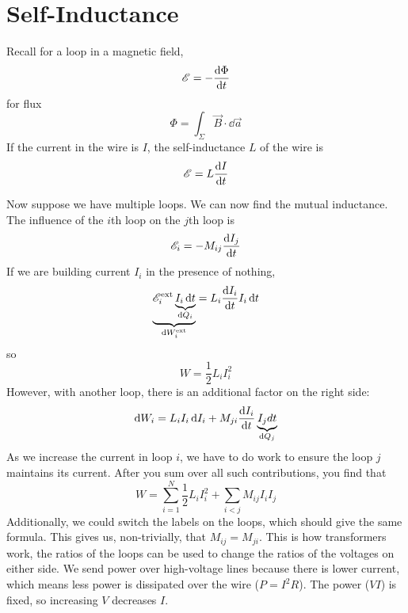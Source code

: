 \documentclass[a4paper,twoside,master.tex]{subfiles}
\begin{document}
\section{Self-Inductance}
\label{sec:self_inductance}

Recall for a loop in a magnetic field,
\begin{equation}
    \mathscr{E} = - \dv{\Phi}{t}
\end{equation}
for flux
\begin{equation}
    \Phi = \int_{\Sigma} \vec{B} \cdot \dd{ \vec{a}}
\end{equation}
If the current in the wire is $ I $, the self-inductance $ L $  of the wire is
\begin{equation}
    \mathscr{E} = L \dv{I}{t}
\end{equation}

Now suppose we have multiple loops. We can now find the mutual inductance. The influence of the $ i $th loop on the $ j $th loop is
\begin{equation}
    \mathscr{E}_i = -M_{ij} \dv{I_j}{t}
\end{equation}
If we are building current $ I_i $ in the presence of nothing,
\begin{equation}
    \underbrace{\mathscr{E}_i^{\text{ext}} \underbrace{I_i \dd{t}}_{\dd{Q_i}}}_{\dd{W_i^{\text{ext}}}}  = L_i \dv{I_i}{t}I_i \dd{t}
\end{equation}
so
\begin{equation}
    W = \frac{1}{2} L_i I_i^2
\end{equation}
However, with another loop, there is an additional factor on the right side:
\begin{equation}
    \dd{W_i} = L_i I_i \dd{I_i} + M_{ji} \dv{I_i}{t}\underbrace{I_j dt}_{\dd{Q_j}}
\end{equation}
As we increase the current in loop $ i $, we have to do work to ensure the loop $ j $ maintains its current. After you sum over all such contributions, you find that
\begin{equation}
    W = \sum_{i=1}^{N} \frac{1}{2} L_i I_i^2 + \sum_{i<j} M_{ij} I_i I_j
\end{equation}
Additionally, we could switch the labels on the loops, which should give the same formula. This gives us, non-trivially, that $ M_{ij} = M_{ji} $. This is how transformers work, the ratios of the loops can be used to change the ratios of the voltages on either side. We send power over high-voltage lines because there is lower current, which means less power is dissipated over the wire ($ P = I^2 R $). The power ($ VI $) is fixed, so increasing $ V $ decreases $ I $.
\end{document}
